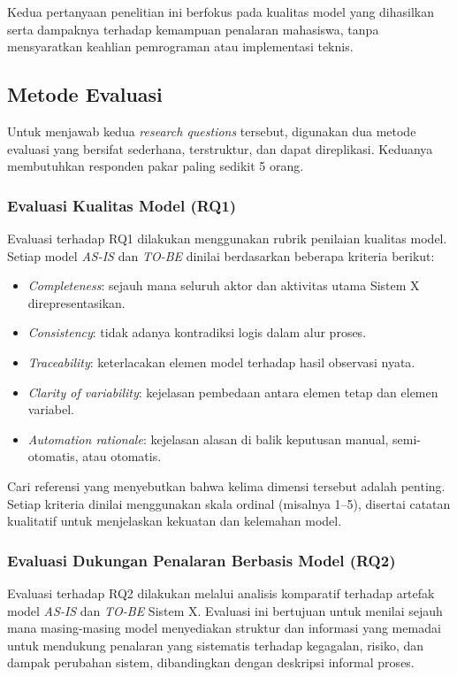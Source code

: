 Kedua pertanyaan penelitian ini berfokus pada kualitas model yang dihasilkan serta dampaknya terhadap kemampuan penalaran mahasiswa, tanpa mensyaratkan keahlian pemrograman atau implementasi teknis.

\subsection*{Metode Evaluasi}

Untuk menjawab kedua \textit{research questions} tersebut, digunakan dua metode evaluasi yang bersifat sederhana, terstruktur, dan dapat direplikasi. Keduanya membutuhkan responden pakar paling sedikit 5 orang.

\subsubsection*{Evaluasi Kualitas Model (RQ1)}

Evaluasi terhadap RQ1 dilakukan menggunakan rubrik penilaian kualitas model. Setiap model \textit{AS-IS} dan \textit{TO-BE} dinilai berdasarkan beberapa kriteria berikut:

\begin{itemize}
    \item \textit{Completeness}: sejauh mana seluruh aktor dan aktivitas utama Sistem X direpresentasikan.
    \item \textit{Consistency}: tidak adanya kontradiksi logis dalam alur proses.
    \item \textit{Traceability}: keterlacakan elemen model terhadap hasil observasi nyata.
    \item \textit{Clarity of variability}: kejelasan pembedaan antara elemen tetap dan elemen variabel.
    \item \textit{Automation rationale}: kejelasan alasan di balik keputusan manual, semi-otomatis, atau otomatis.
\end{itemize}

Cari referensi yang menyebutkan bahwa kelima dimensi tersebut adalah penting. Setiap kriteria dinilai menggunakan skala ordinal (misalnya 1--5), disertai catatan kualitatif untuk menjelaskan kekuatan dan kelemahan model.

\subsubsection*{Evaluasi Dukungan Penalaran Berbasis Model (RQ2)}

Evaluasi terhadap RQ2 dilakukan melalui analisis komparatif terhadap artefak model \textit{AS-IS} dan \textit{TO-BE} Sistem X. Evaluasi ini bertujuan untuk menilai sejauh mana masing-masing model menyediakan struktur dan informasi yang memadai untuk mendukung penalaran yang sistematis terhadap kegagalan, risiko, dan dampak perubahan sistem, dibandingkan dengan deskripsi informal proses.

